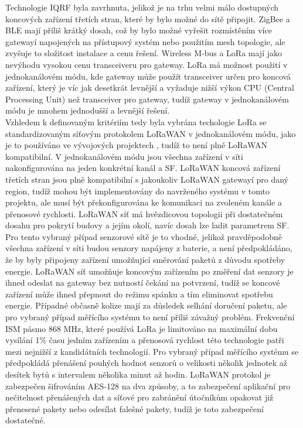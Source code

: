 Technologie IQRF byla zavrhnuta, jelikož je na trhu velmi málo dostupných koncových zařízení třetích stran, které by bylo možné do sítě připojit. 
ZigBee a BLE mají příliš krátký dosah, což by bylo možné vyřešit rozmístěním více gatewayí napojených na přístupový systém nebo použitím mesh topologie, ale zvyšuje to složitost instalace a cenu řešení. 
Wireless M-bus a LoRa mají jako nevýhodu vysokou cenu transceiveru pro gateway. 
LoRa má možnost použití v jednokanálovém módu, kde gateway může použít transceiver určen pro koncová zařízení, který je víc jak desetkrát levnější a vyžaduje nižší výkon CPU (Central Processing Unit) než transceiver pro gateway, tudíž gateway v jednokanálovém módu je mnohem jednodušší a levnější řešení.
\\
Vzhledem k definovaným kritériím tedy byla vybrána techologie LoRa se standardizovaným síťovým protokolem LoRaWAN v jednokanálovém módu, jako je to používáno ve vývojových projektech \cite{Analysis of Propagation Link for Remote Weather}, tudíž to není plně LoRaWAN kompatibilní.
V jednokanálovém módu jsou všechna zařízení v síti nakonfigurována na jeden konkrétní kanál a SF.
LoRaWAN koncová zařízení třetích stran jsou plně kompatibilní s jakoukoliv LoRaWAN gatewayí pro daný region, tudíž mohou být implementovány do navrženého systému v tomto projektu, ale musí být překonfigurována ke komunikaci na zvoleném kanále a přenosové rychlosti. 
LoRaWAN síť má hvězdicovou topologii při dostatečném dosahu pro pokrytí budovy a jejím okolí, navíc dosah lze ladit parametrem SF. Pro tento vybraný případ senzorové sítě je to vhodné, jelikož pravděpodobně všechna zařízení v síti budou senzory napájeny z baterie, a není předpokládáno, že by byly připojeny zařízení umožňující směrování paketů z důvodu spotřeby energie. 
LoRaWAN síť umožňuje koncovým zařízením po změření dat senzory je ihned odeslat na gateway bez nutností čekání na potvrzení, tudíž se koncové zařízení může ihned přepnout do režimu spánku a tím eliminovat spotřebu energie. 
Případné občasně kolize mají za důsledek selhání doručení paketu, ale pro vybraný případ měřícího systému to není příliš závažný problém.
Frekvenční ISM pásmo 868 MHz, které používá LoRa je limitováno na maximální dobu vysílání 1\% času jedním zařízením a přenosová rychlost této technologie patři mezi nejnižší z kandidátních technologií. 
Pro vybraný případ měřícího systému se předpokládá přenášení pouhých hodnot senzorů o velikosti několik jednotek až desítek bytů s intervalem několika minut až hodin.
LoRaWAN protokol je zabezpečen šifrováním AES-128 na dva způsoby, a to zabezpečení aplikační pro nečitelnost přenášených dat a síťové pro zabránění útočníkům opakovat již přenesené pakety nebo odesílat falešné pakety, tudíž je toto zabezpečení dostatečné. 

